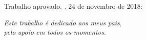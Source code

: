 \documentclass[
	12pt,				%
	openright,			%
	twoside,			%
	a4paper,			%
	english,			%
	brazil				%
	]{abntex2}
\begin{document}
%
% 
%
\begin{folhadeaprovacao}

  \begin{center}
    {\ABNTEXchapterfont\large\imprimirautor}

    \vspace*{\fill}\vspace*{\fill}
    \begin{center}
      \ABNTEXchapterfont\bfseries\Large\imprimirtitulo
    \end{center}
    \vspace*{\fill}
    
    \hspace{.45\textwidth}
    \begin{minipage}{.5\textwidth}
        \imprimirpreambulo
    \end{minipage}%
    \vspace*{\fill}
   \end{center}
        
   Trabalho aprovado. \imprimirlocal, 24 de novembro de 2018:

      
   \begin{center}
    \vspace*{0.5cm}
    {\large\imprimirlocal}
    \par
    {\large\imprimirdata}
    \vspace*{1cm}
  \end{center}
  
\end{folhadeaprovacao}

\begin{dedicatoria}
    \vspace*{\fill}
    \centering
    \noindent
    \textit{ Este trabalho é dedicado aos meus pais,\\
    pelo apoio em todos os momentos.} \vspace*{\fill}
 \end{dedicatoria}
\end{document}
